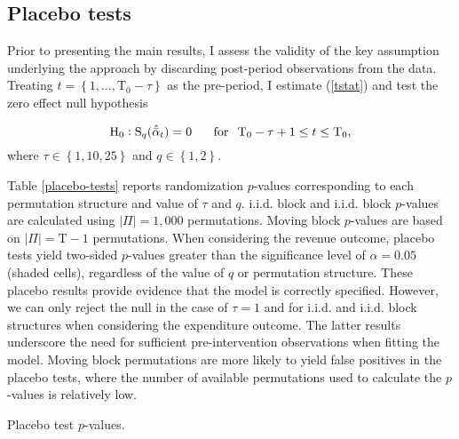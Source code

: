 \subsection{Placebo tests}

Prior to presenting the main results, I assess the validity of the key assumption underlying the approach by discarding post-period observations from the data. Treating $t = \left\{1, \ldots,  \text{T}_0 - \tau\right\}$ as the pre-period, I estimate (\ref{tstat}) and test the zero effect null hypothesis 

\begin{equation} \label{h0-placebo}
\text{H}_0: \text{S}_q (\hat{\bar{\alpha}}_{t}) = 0  \, \hspace{5mm} \,  \text{for} \, \hspace{2mm}  \text{T}_0 - \tau +1 \leq t \leq  \text{T}_0,
\end{equation}
\noindent
where $\tau \in \left\{1, 10, 25\right\}$ and $q \in \left\{1, 2\right\}$. 

Table \ref{placebo-tests} reports randomization $p$-values corresponding to each permutation structure and value of $\tau$ and $q$. i.i.d. block and i.i.d. block $p$-values are calculated using $|\Pi| = 1,000$ permutations. Moving block $p$-values are based on $|\Pi| = \text{T}-1$ permutations. When considering the revenue outcome, placebo tests yield two-sided $p$-values greater than the significance level of $\alpha = 0.05$ (shaded cells), regardless of the value of $q$ or permutation structure. These placebo results provide evidence that the model is correctly specified. However, we can only reject the null in the case of $\tau=1$ and for i.i.d. and i.i.d. block structures when considering the expenditure outcome. The latter results underscore the need for sufficient pre-intervention observations when fitting the model. Moving block permutations are more likely to yield false positives in the placebo tests, where the number of available permutations used to calculate the $p$-values is relatively low. 

\begin{table}[htbp]
	\captionsetup{font=normalsize}
	\caption{Placebo test $p$-values.\label{placebo-tests}}
	\begin{center}
		\scalebox{.9}{}
	\end{center}
\end{table}

